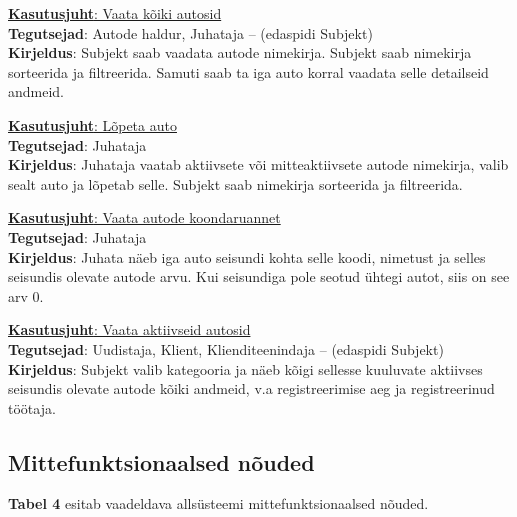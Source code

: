 \begin{flushleft}
	\underline{\textbf{Kasutusjuht}: Vaata kõiki autosid} \\
	\textbf{Tegutsejad}: Autode haldur, Juhataja – (edaspidi Subjekt) \\
	\textbf{Kirjeldus}: Subjekt saab vaadata autode nimekirja. Subjekt saab nimekirja sorteerida ja filtreerida. Samuti saab ta iga auto korral vaadata selle detailseid andmeid. 
\end{flushleft}

\begin{flushleft}
	\underline{\textbf{Kasutusjuht}: Lõpeta auto} \\
	\textbf{Tegutsejad}: Juhataja \\
	\textbf{Kirjeldus}: Juhataja vaatab aktiivsete või mitteaktiivsete autode nimekirja, valib sealt auto ja lõpetab selle. Subjekt saab nimekirja sorteerida ja filtreerida. 
\end{flushleft}

\begin{flushleft}
	\underline{\textbf{Kasutusjuht}: Vaata autode koondaruannet} \\
	\textbf{Tegutsejad}: Juhataja \\
	\textbf{Kirjeldus}: Juhata näeb iga auto seisundi kohta selle koodi, nimetust ja selles seisundis olevate autode arvu. Kui seisundiga pole seotud ühtegi autot, siis on see arv 0. 
\end{flushleft}

\begin{flushleft}
	\underline{\textbf{Kasutusjuht}: Vaata aktiivseid autosid} \\
	\textbf{Tegutsejad}: Uudistaja, Klient, Klienditeenindaja – (edaspidi Subjekt) \\
	\textbf{Kirjeldus}: Subjekt valib kategooria ja näeb kõigi sellesse kuuluvate aktiivses seisundis olevate autode kõiki andmeid, v.a registreerimise aeg ja registreerinud töötaja. 
\end{flushleft}


\subsection{Mittefunktsionaalsed nõuded}

\textbf{Tabel 4} esitab vaadeldava allsüsteemi mittefunktsionaalsed nõuded.



